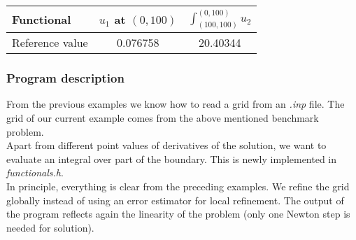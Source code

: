 \begin{table}[h]
\centering
\begin{tabular}{lcc}    
\hline
 Functional & $u_1$ at $(0,100)$ & $\int_{(100,100)}^{(0,100)} u_2$\\
\hline 
 Reference value & 0.076758 & 20.40344\\
\hline
\end{tabular}
\end{table}

\subsubsection{Program description}

From the previous examples we know how to read a grid from an \textit{.inp} file. The grid of our current example comes from the above mentioned benchmark problem.\\
Apart from different point values of derivatives of the solution, we want to evaluate an integral over part of the boundary.  This is newly implemented in \textit{functionals.h}.\\
In principle, everything is clear from the preceding examples. We refine the grid globally instead of using an error estimator for local refinement.
The output of the program reflects again the linearity of the problem (only one Newton step is needed for solution).\\

